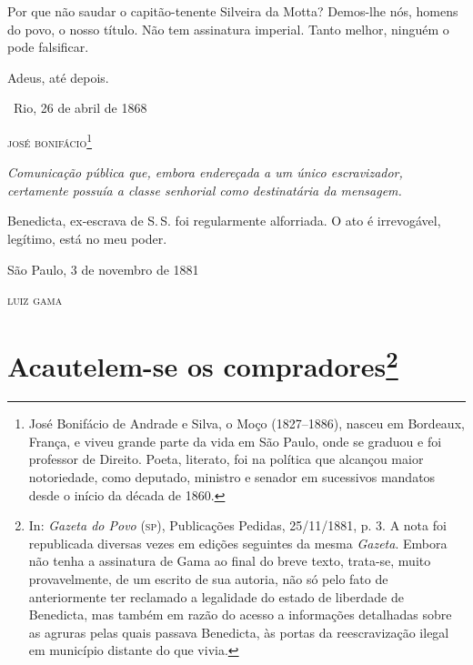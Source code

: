 Por que não saudar o capitão-tenente Silveira da Motta? Demos-lhe nós,
homens do povo, o nosso título. Não tem assinatura imperial. Tanto
melhor, ninguém o pode falsificar.

Adeus, até depois.\medskip

\hfill\ Rio, 26 de abril de 1868

\hfill\textsc{josé bonifácio}\footnote{José Bonifácio de Andrade e Silva, o Moço
  (1827--1886), nasceu em Bordeaux, França, e viveu grande parte da vida
  em São Paulo, onde se graduou e foi professor de Direito. Poeta,
  literato, foi na política que alcançou maior notoriedade, como
  deputado, ministro e senador em sucessivos mandatos desde o início da
  década de 1860.}



\begin{resumo}
\emph{Comunicação pública que, embora endereçada a um único
escravizador, certamente possuía a classe senhorial como destinatária da
mensagem.}
\end{resumo}

Benedicta, ex-escrava de S.\,S. foi regularmente alforriada. O ato é
irrevogável, legítimo, está no meu poder.

\medskip

\hfill São Paulo, 3 de novembro de 1881

\hfill\textsc{luiz gama}

\chapter{Acautelem-se os compradores\footnote{In: \emph{Gazeta do Povo} (\textsc{sp}), Publicações
  Pedidas, 25/11/1881, p. 3. A nota foi republicada diversas vezes em
  edições seguintes da mesma \emph{Gazeta}. Embora não tenha a
  assinatura de Gama ao final do breve texto, trata-se, muito
  provavelmente, de um escrito de sua autoria, não só pelo fato de
  anteriormente ter reclamado a legalidade do estado de liberdade de
  Benedicta, mas também em razão do acesso a informações detalhadas
  sobre as agruras pelas quais passava Benedicta, às portas da
  reescravização ilegal em município distante do que vivia.}}

